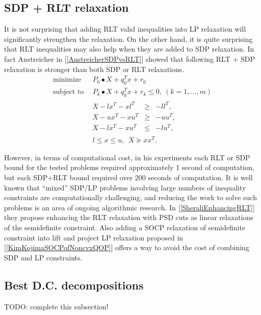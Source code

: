 \documentclass[12pt]{book}
\theoremstyle{definition}
\begin{document}
\subsection{SDP + RLT relaxation}
It is not surprising that adding RLT valid inequalities into LP relaxation will significantly strengthen the relaxation. 
On the other hand, it is quite surprising that RLT inequalities may also help when they are added to SDP relaxation. 
In fact Anstreicher in [\ref{AnstreicherSDPvsRLT}] showed that following RLT + SDP relaxation is stronger than both SDP or RLT relaxations.
 \begin{equation}
\label{SDP+RLTrelax1} 
\begin{array}{ll}
\mbox{minimize}&\ \ P_0\bullet X + q_0^Tx + r_0\\
\mbox{subject to}&\ \ P_k\bullet X+ q_k^Tx + r_k \leq 0, \  (k = 1,\dots ,m)\\
		& \begin{array}{lcl}
		 X - lx^T - xl^T & \geq & -ll^T, \\
		 X - ux^T - xu^T & \geq & -uu^T, \\
		 X - lx^T - xu^T & \leq & -lu^T, 
		 \end{array}\\
 		&\ \ l\leq x \leq u, \ \  X \succeq xx^T.
\end{array} 
\end{equation}

However, in terms of computational cost, in his experiments each RLT or SDP bound for the tested problems required approximately 1
second of computation, but each SDP+RLT bound required over 200 seconds of computation. It
is well known that “mixed” SDP/LP problems involving large numbers of inequality constraints
are computationally challenging, and reducing the work to solve such problems is an area of ongoing
algorithmic research. In [\ref{SheraliEnhancingRLT}] they propose enhancing the RLT relaxation with PSD cuts as linear relaxations of the semidefinite constraint. Also adding a SOCP relaxation of semidefinite constraint into lift and project LP relaxation proposed in [\ref{KimKojimaSOCPofNoncvxQOP}] offers a way to avoid the cost of combining SDP and LP constraints.

\subsection{Best D.C. decompositions}
TODO: complete this subsection!
\end{document}
